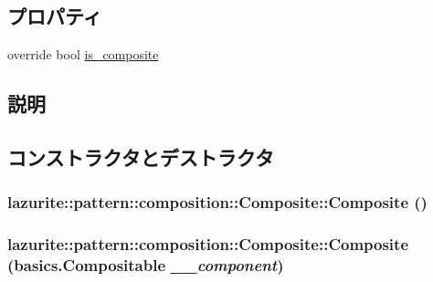 \subsection*{プロパティ}
\begin{DoxyCompactItemize}
\item 
override bool \hyperlink{classlazurite_1_1pattern_1_1composition_1_1_composite_a38ec1a6e088e9831d4e3045d0741f7cb}{is\_\-composite}
\end{DoxyCompactItemize}


\subsection{説明}


\subsection{コンストラクタとデストラクタ}
\hypertarget{classlazurite_1_1pattern_1_1composition_1_1_composite_add95ff2ba65d1b7c1ca915de4b22d5f9}{
\subsubsection[{Composite}]{\setlength{\rightskip}{0pt plus 5cm}lazurite::pattern::composition::Composite::Composite ()}}
\label{classlazurite_1_1pattern_1_1composition_1_1_composite_add95ff2ba65d1b7c1ca915de4b22d5f9}
\hypertarget{classlazurite_1_1pattern_1_1composition_1_1_composite_a04db62f594857a07f40800b11d546841}{
\subsubsection[{Composite}]{\setlength{\rightskip}{0pt plus 5cm}lazurite::pattern::composition::Composite::Composite ({\bf basics.Compositable} {\em \_\-\_\-component})}}
\label{classlazurite_1_1pattern_1_1composition_1_1_composite_a04db62f594857a07f40800b11d546841}

